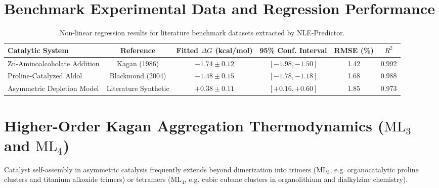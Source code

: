 \documentclass[11pt,a4paper]{article}
\begin{document}
\section{Benchmark Experimental Data and Regression Performance}

\begin{table}[htbp]
\centering
\caption{Non-linear regression results for literature benchmark datasets extracted by NLE-Predictor.}
\label{tab:benchmarks}
\begin{tabular}{lccccc}
\toprule
\textbf{Catalytic System} & \textbf{Reference} & \textbf{Fitted $\Delta G$ (kcal/mol)} & \textbf{95\% Conf. Interval} & \textbf{RMSE (\%)} & \textbf{$R^2$} \\
\midrule
Zn-Aminoalcoholate Addition & Kagan (1986) \cite{Kagan1986} & $-1.74 \pm 0.12$ & $[-1.98, -1.50]$ & 1.42 & 0.992 \\
Proline-Catalyzed Aldol     & Blackmond (2004) \cite{Blackmond2004} & $-1.48 \pm 0.15$ & $[-1.78, -1.18]$ & 1.68 & 0.988 \\
Asymmetric Depletion Model  & Literature Synthetic & $+0.38 \pm 0.11$ & $[+0.16, +0.60]$ & 1.85 & 0.973 \\
\bottomrule
\end{tabular}
\end{table}

\section{Higher-Order Kagan Aggregation Thermodynamics ($\text{ML}_3$ and $\text{ML}_4$)}

Catalyst self-assembly in asymmetric catalysis frequently extends beyond dimerization into trimers ($\text{ML}_3$, e.g. organocatalytic proline clusters and titanium alkoxide trimers) or tetramers ($\text{ML}_4$, e.g. cubic cubane clusters in organolithium and dialkylzinc chemistry).
\end{document}
